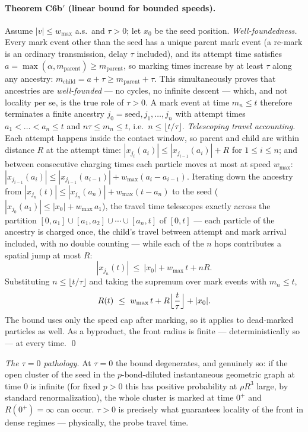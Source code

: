 \documentclass[11pt]{article}
\begin{document}
\paragraph{Theorem C6b$'$ (linear bound for bounded speeds).}
Assume $|v|\le w_{\max}$ a.s.\ and $\tau>0$; let $x_0$ be the seed
position. \emph{Well-foundedness.} Every mark event other than the seed
has a unique parent mark event (a re-mark is an ordinary transmission,
delay $\tau$ included), and its attempt time satisfies
$a=\max(\alpha,m_{\mathrm{parent}})\ge m_{\mathrm{parent}}$, so marking
times increase by at least $\tau$ along any ancestry:
$m_{\mathrm{child}}=a+\tau\ge m_{\mathrm{parent}}+\tau$. This
simultaneously proves that ancestries are \emph{well-founded} --- no
cycles, no infinite descent --- which, and not locality per se, is the true
role of $\tau>0$. A mark event at time $m_n\le t$ therefore terminates a
finite ancestry $j_0=\mathrm{seed},j_1,\dots,j_n$ with attempt times
$a_1<\dots<a_n\le t$ and $n\tau\le m_n\le t$, i.e.\
$n\le\lfloor t/\tau\rfloor$. \emph{Telescoping travel accounting.} Each
attempt happens inside the contact window, so parent and child are within
distance $R$ at the attempt time:
$|x_{j_i}(a_i)|\le|x_{j_{i-1}}(a_i)|+R$ for $1\le i\le n$; and between
consecutive charging times each particle moves at most at speed
$w_{\max}$:
$|x_{j_{i-1}}(a_i)|\le|x_{j_{i-1}}(a_{i-1})|+w_{\max}(a_i-a_{i-1})$.
Iterating down the ancestry from
$|x_{j_n}(t)|\le|x_{j_n}(a_n)|+w_{\max}(t-a_n)$ to the seed
($|x_{j_0}(a_1)|\le|x_0|+w_{\max}\,a_1$), the travel time telescopes
exactly across the partition $[0,a_1]\cup[a_1,a_2]\cup\cdots\cup[a_n,t]$ of
$[0,t]$ --- each particle of the ancestry is charged once, the child's
travel between attempt and mark arrival included, with no double counting
--- while each of the $n$ hops contributes a spatial jump at most $R$:
\[
  |x_{j_n}(t)|\ \le\ |x_0|+w_{\max}\,t+nR .
\]
Substituting $n\le\lfloor t/\tau\rfloor$ and taking the supremum over mark
events with $m_n\le t$,
\[
  R(t)\ \le\ w_{\max}\,t+R\Bigl\lfloor\frac{t}{\tau}\Bigr\rfloor+|x_0| .
\]
The bound uses only the speed cap after marking, so it applies to
dead-marked particles as well. As a byproduct, the front radius is finite
--- deterministically so --- at every time. \qed

\smallskip
\emph{The $\tau=0$ pathology.} At $\tau=0$ the bound degenerates, and
genuinely so: if the open cluster of the seed in the $p$-bond-diluted
instantaneous geometric graph at time $0$ is infinite (for fixed $p>0$
this has positive probability at $\rho R^3$ large, by standard
renormalization), the whole cluster is marked at time $0^+$ and
$R(0^+)=\infty$ can occur. $\tau>0$ is precisely what guarantees locality
of the front in dense regimes --- physically, the probe travel time.
\end{document}
